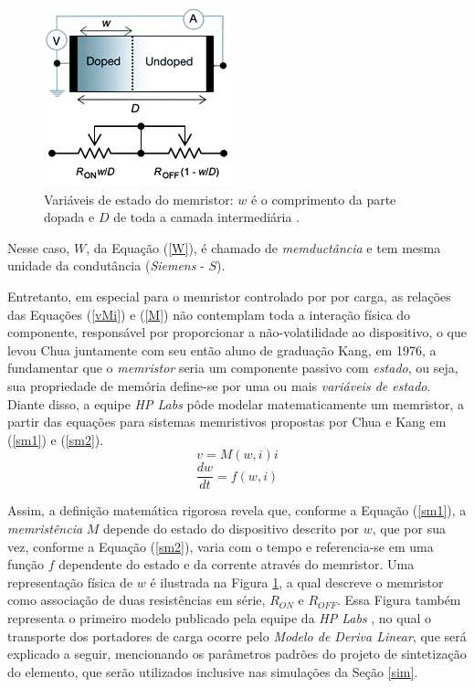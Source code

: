 \documentclass{ceel}
\begin{document}
\begin{multicols}{2}
\begin{figure}[H]
\centering
\includegraphics[width=0.7\columnwidth]{new-w}
\caption{Variáveis de estado do memristor: $w$ é o comprimento da parte dopada e $D$ de toda a camada intermediária \cite{image}.}\label{w}
\end{figure}

\vspace{0.2cm}
Nesse caso, $W$, da Equação (\ref{W}), é chamado de \textit{memductância} e tem mesma unidade da condutância (\textit{Siemens} - $S$).

Entretanto, em especial para o memristor controlado por por carga, as relações das Equações (\ref{vMi}) e (\ref{M}) não contemplam toda a interação física do componente, responsável por proporcionar a não-volatilidade ao dispositivo, o que levou Chua juntamente com seu então aluno de graduação Kang, em 1976, a fundamentar que o \emph{memristor} seria um componente passivo com \emph{estado}, ou seja, sua propriedade de memória define-se por uma ou mais \emph{variáveis de estado}.
Diante disso, a equipe \emph{HP Labs} pôde modelar matematicamente um memristor, a partir das equações para sistemas memristivos propostas por Chua e Kang \cite{1976} em (\ref{sm1}) e (\ref{sm2}).
\begin{equation}\label{sm1}
v=M(w, i)i
\end{equation}
\begin{equation}\label{sm2}
\dfrac{dw}{dt}=f(w, i)
\end{equation}
\vspace{0.00001cm}

Assim, a definição matemática rigorosa revela que, conforme a Equação (\ref{sm1}), a \emph{memristência} $M$ depende do estado do dispositivo descrito por $w$, que por sua vez, conforme a Equação (\ref{sm2}), varia com o tempo e referencia-se em uma função $f$ dependente do estado e da corrente através do memristor. Uma representação física de $w$ é ilustrada na Figura \ref{w}, a qual descreve o memristor como associação de duas resistências em série, $R_{ON}$ e $R_{OFF}$. Essa Figura também representa o primeiro modelo publicado pela equipe da \emph{HP Labs} \cite{nature}, no qual o transporte dos portadores de carga ocorre pelo \emph{Modelo de Deriva Linear}, que será explicado a seguir, mencionando os parâmetros padrões do projeto de sintetização do elemento, que serão utilizados inclusive nas simulações da Seção \ref{sim}.


\end{multicols}
\end{document}
